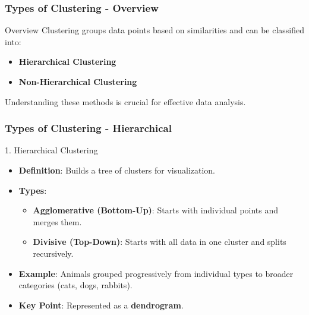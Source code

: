\documentclass[aspectratio=169]{beamer}
\begin{document}
\begin{frame}[fragile]
    \frametitle{Types of Clustering - Overview}
    \begin{block}{Overview}
        Clustering groups data points based on similarities and can be classified into:
        \begin{itemize}
            \item \textbf{Hierarchical Clustering}
            \item \textbf{Non-Hierarchical Clustering}
        \end{itemize}
        Understanding these methods is crucial for effective data analysis.
    \end{block}
\end{frame}

\begin{frame}[fragile]
    \frametitle{Types of Clustering - Hierarchical}
    \begin{block}{1. Hierarchical Clustering}
        \begin{itemize}
            \item \textbf{Definition}: Builds a tree of clusters for visualization.
            \item \textbf{Types}:
                \begin{itemize}
                    \item \textbf{Agglomerative (Bottom-Up)}: Starts with individual points and merges them.
                    \item \textbf{Divisive (Top-Down)}: Starts with all data in one cluster and splits recursively.
                \end{itemize}
            \item \textbf{Example}: Animals grouped progressively from individual types to broader categories (cats, dogs, rabbits).
            \item \textbf{Key Point}: Represented as a \textbf{dendrogram}.
        \end{itemize}
    \end{block}
\end{frame}
\end{document}
